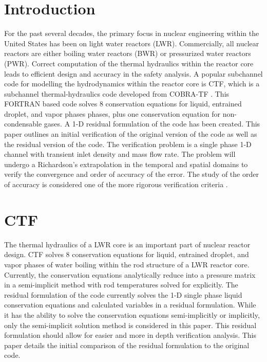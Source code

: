 \documentclass{mc2015}
\begin{document}
\clearpage

%

\section{Introduction}

For the past several decades, the primary focus in nuclear engineering within
the United States has been on light water reactors (LWR). Commercially,
all nuclear reactors are either boiling water reactors (BWR) or pressurized
water reactors (PWR). Correct computation of the thermal hydraulics within the
reactor core leads to efficient design and accuracy in the safety analysis. A
popular subchannel code for modelling the hydrodynamics within the reactor core
is CTF, which is a subchannel thermal-hydraulics code developed from
COBRA-TF \cite{Salko2014}. This FORTRAN based code solves 8 conservation
equations for liquid, entrained droplet, and vapor phases phases, plus one
conservation equation for non-condensable gases. A 1-D residual formulation of
the code has been created. This paper outlines an initial verification of the
original version of the code as well as the residual version of the code. The
verification problem is a single phase 1-D channel with transient inlet density
and mass flow rate. The problem will undergo a Richardson's extrapolation in the
temporal and spatial domains to verify the convergence and order of accuracy of
the error. The study of the order of accuracy is considered one of the more
rigorous verification criteria \cite{Roache2002}.

\section{CTF}

The thermal hydraulics of a LWR core is an important part of nuclear
reactor design. CTF solves 8 conservation equations for liquid,
entrained droplet, and vapor phases of water boiling within the rod structure
of a LWR reactor core. Currently, the conservation
equations analytically reduce into a pressure matrix in a semi-implicit
method with rod temperatures solved for explicitly. The residual formulation of
the code currently solves the 1-D single phase liquid conservation equations and
calculated variables in a residual formulation. While it has the ability to
solve the conservation equations semi-implicitly or implicitly, only the
semi-implicit solution method is considered in this paper. This residual
formulation should allow for easier and more in depth verification  analysis.
This paper details the initial comparison of the residual  formulation to the original code.
\end{document}
